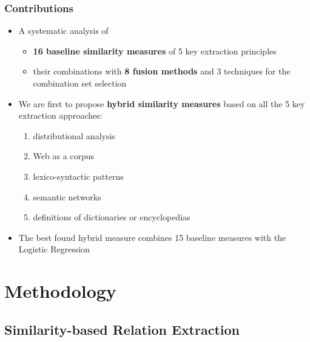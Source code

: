 \documentclass{beamer}
\begin{document}
\begin{frame}
\frametitle{Contributions}
\begin{itemize}
\item A systematic analysis of 
\begin{itemize}
  \item \textbf{16 baseline similarity measures} of 5 key extraction principles
  \item their combinations with \textbf{8 fusion methods} and 3 techniques for the combination set selection
\end{itemize}

\item We are first to propose \textbf{hybrid similarity measures} based on  all the 5 key extraction approaches:
\begin{enumerate}
  \item distributional analysis
  \item Web as a corpus 
  \item	lexico-syntactic patterns
  \item	semantic networks 
  \item definitions of dictionaries or encyclopedias 
\end{enumerate}

\item The best found hybrid measure combines 15 baseline measures with the Logistic Regression
 

\end{itemize}

\end{frame}


\section{Methodology}
\subsection{Similarity-based Relation Extraction}
\end{document}
